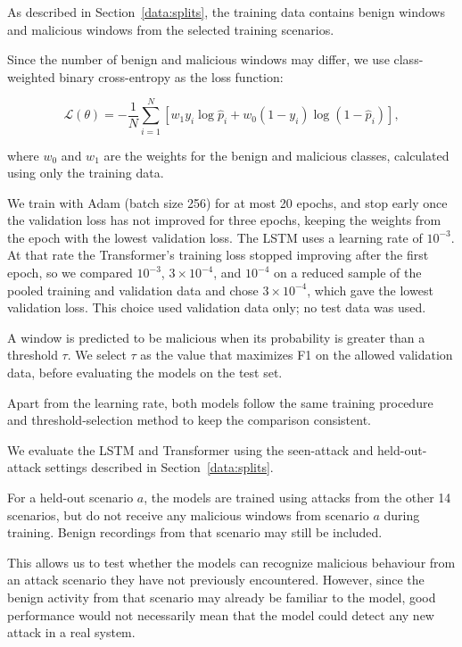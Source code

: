 \documentclass{article}
\begin{document}
As described in Section~\ref{data:splits}, the training
data contains benign windows and malicious windows from
the selected training scenarios.

Since the number of benign and malicious windows may
differ, we use class-weighted binary cross-entropy as
the loss function:

\begin{equation}
\mathcal L(\theta)=-\frac{1}{N}\sum_{i=1}^N
\left[
w_1 y_i\log\hat p_i
+w_0(1-y_i)\log(1-\hat p_i)
\right],
\end{equation}

where $w_0$ and $w_1$ are the weights for the benign
and malicious classes, calculated using only the
training data.

We train with Adam (batch size 256) for at most 20 epochs,
and stop early once the validation loss has not improved
for three epochs, keeping the weights from the epoch with
the lowest validation loss. The LSTM uses a learning rate
of $10^{-3}$. At that rate the Transformer's training loss
stopped improving after the first epoch, so we compared
$10^{-3}$, $3\times10^{-4}$, and $10^{-4}$ on a reduced
sample of the pooled training and validation data and
chose $3\times10^{-4}$, which gave the lowest validation
loss. This choice used validation data only; no test
data was used.

A window is predicted to be malicious when its probability
is greater than a threshold $\tau$. We select $\tau$ as the
value that maximizes F1 on the allowed validation data,
before evaluating the models on the test set.

Apart from the learning rate, both models follow the
same training procedure and threshold-selection method
to keep the comparison consistent.

We evaluate the LSTM and Transformer using the
seen-attack and held-out-attack settings described
in Section~\ref{data:splits}.

For a held-out scenario $a$, the models are trained
using attacks from the other 14 scenarios, but do not
receive any malicious windows from scenario $a$
during training. Benign recordings from that scenario
may still be included.

This allows us to test whether the models can recognize
malicious behaviour from an attack scenario they have
not previously encountered. However, since the benign
activity from that scenario may already be familiar
to the model, good performance would not necessarily
mean that the model could detect any new attack in
a real system.
\end{document}
